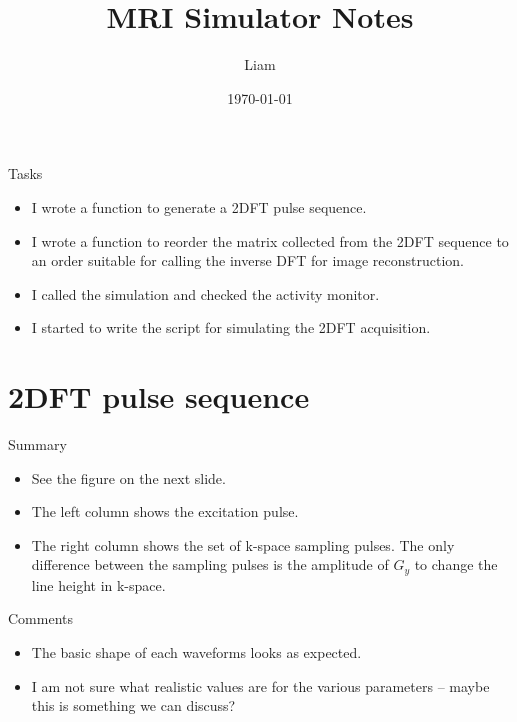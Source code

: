 \documentclass[dvipsnames]{beamer}
\title{MRI Simulator Notes}
\author{Liam}
\date{\today}
\begin{document}
\begin{frame}
\maketitle
\end{frame}

\begin{frame}{Tasks}
\begin{itemize}
\item I wrote a function to generate a 2DFT pulse sequence.
\item I wrote a function to reorder the matrix collected from the 2DFT sequence to an order suitable for calling the inverse DFT for image reconstruction.
\item I called the simulation and checked the activity monitor.
\item I started to write the script for simulating the 2DFT acquisition.
\end{itemize}
\end{frame}

\section{2DFT pulse sequence}

\begin{frame}{Summary}
\begin{itemize}
\item See the figure on the next slide.
\item The left column shows the excitation pulse.
\item The right column shows the set of k-space sampling pulses. The only difference between the sampling pulses is the amplitude of $G_y$ to change the line height in k-space.
\end{itemize}
\end{frame}

\begin{frame}{2DFT pulse sequence example}
\begin{center}
\texttt{[image: \{pulse\_sequence\_2dft]}}
\end{center}
\end{frame}

\begin{frame}{Comments}
\begin{itemize}
\item The basic shape of each waveforms looks as expected.
\item I am not sure what realistic values are for the various parameters -- maybe this is something we can discuss?
\end{itemize}
\end{frame}
\end{document}
